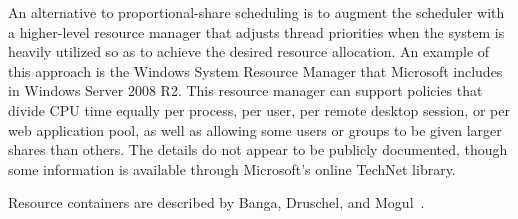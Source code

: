 An alternative to proportional-share scheduling is to augment the scheduler with a higher-level resource manager that adjusts
thread priorities when the system is heavily utilized so as to achieve the desired resource allocation.  An example of this
approach is the Windows System Resource Manager that Microsoft includes in Windows Server 2008 R2.  This resource manager
can support policies that divide CPU time equally per process, per user, per remote desktop session, or per web application pool, as well as allowing some users or groups to be given larger shares than others.  The details do not appear to be publicly documented,
though some information is available through Microsoft's online TechNet library.


Resource containers are described by
Banga, Druschel, and
Mogul~\cite{max986}.
